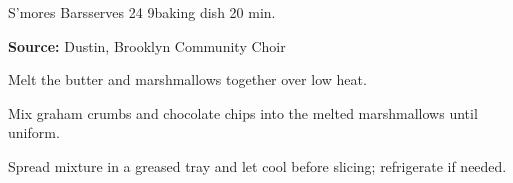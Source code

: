 \begin{recipe}{S'mores Bars}{serves 24}{ \hfill 9\inch{}\inch baking dish \hfill 20 min.}

 \freeform \textbf{Source:} Dustin, Brooklyn Community Choir

 Melt the butter and marshmallows together over low heat.

 Mix graham crumbs and chocolate chips into the melted marshmallows until uniform.

 \newstep Spread mixture in a greased tray and let cool before slicing; refrigerate if needed.
\end{recipe}
